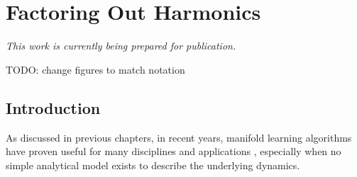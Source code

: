
\chapter{Factoring Out Harmonics\label{ch:harmonics}}

\graphicspath{{ch-harmonics/figures/}}

{\em This work is currently being prepared for publication.}

TODO: change figures to match notation


\section{Introduction}

As discussed in previous chapters, in recent years, manifold learning algorithms have proven useful for many disciplines and applications \cite{gepshtein2013image, fernandez2014diffusion, singer2011viewing, yuan2014automated, zhao2003face, trapnell2014dynamics, kemelmacher2011exploring, sifre2013rotation}, especially when no simple analytical model exists to describe the underlying dynamics.
%
%
